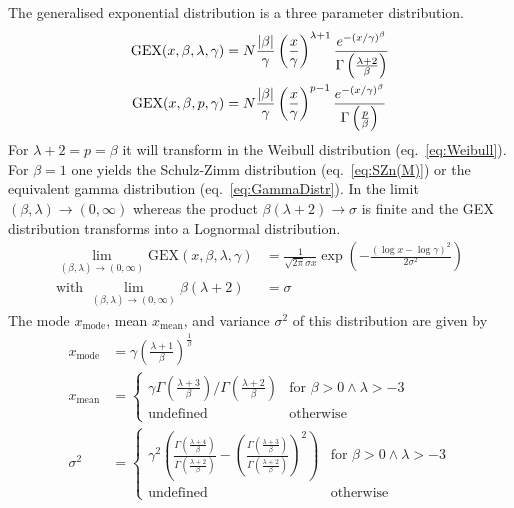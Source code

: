 The generalised exponential distribution is a three parameter distribution.
\begin{align}
\text{GEX} (x,\beta,\lambda,\gamma) &= N \frac{\abs{\beta}}{\gamma} \left(\frac{x}{\gamma}\right)^{\lambda+1}
\frac{e^{-(x/\gamma)^\beta}}{\Gamma\left( \frac{\lambda+2}{\beta} \right)} \\
\text{GEX}(x,\beta,p,\gamma)     &= N
\frac{\abs{\beta}}{\gamma}\left(\frac{x}{\gamma}\right)^{p-1}
\frac{e^{-(x/\gamma)^{\beta}}}{\Gamma  \left( {\frac{p}{\beta}} \right)}
\end{align}
For $\lambda+2=p=\beta$ it will transform in the Weibull distribution (eq.\ \ref{eq:Weibull}). For $\beta=1$ one yields the Schulz-Zimm distribution (eq.\ \ref{eq:SZn(M)}) or the equivalent gamma distribution (eq.\ \ref{eq:GammaDistr}). In the limit $(\beta,\lambda) \rightarrow (0,\infty)$ whereas the product $\beta(\lambda+2)\rightarrow\sigma$ is finite and the GEX distribution transforms into a Lognormal distribution.
\begin{align}
\lim_{(\beta,\lambda)\rightarrow (0,\infty)} \text{GEX} (x,\beta,\lambda,\gamma) &= \frac{1}{\sqrt{2\pi}\sigma x} \exp\left(-\frac{\left(\log x-\log \gamma\right)^2}{2\sigma^2} \right) \\
\mbox{with } \lim_{(\beta,\lambda)\rightarrow (0,\infty)} \beta(\lambda+2) &= \sigma
\end{align}
The mode $x_\mathrm{mode}$, mean $x_\mathrm{mean}$, and variance $\sigma^2$ of this distribution are given by
\begin{align}
x_\mathrm{mode} &= \gamma \left( \frac{\lambda+1}{\beta}\right)^\frac{1}{\beta} \\
x_\mathrm{mean} &=
\begin{cases}
\gamma \Gamma\left(\frac{\lambda+3}{\beta}\right)/\Gamma\left(\frac{\lambda+2}{\beta}\right) & \mbox{for } \beta > 0 \wedge \lambda > -3 \\
\mbox{undefined} & \mbox{otherwise}
\end{cases} \\
\sigma^2 &=
\begin{cases}
\gamma^2 \left(
\frac{\Gamma\left(\frac{\lambda+4}{\beta}\right)}{\Gamma\left(\frac{\lambda+2}{\beta}\right)} -
\left(\frac{\Gamma\left(\frac{\lambda+3}{\beta}\right)}{\Gamma\left(\frac{\lambda+2}{\beta}\right)}\right)^2
\right)& \mbox{for } \beta > 0 \wedge \lambda > -3 \\
\mbox{undefined} & \mbox{otherwise}
\end{cases}
\end{align}

